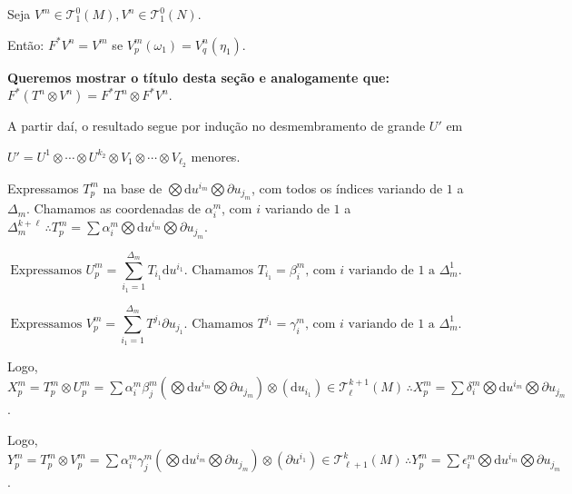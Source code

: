 \documentclass[12pt]{article}
\begin{document}
		\vspace{3mm}

		Seja $V^m \in \mathcal{T}^0_1(M), V^n \in \mathcal{T}^0_1(N)$.

		Ent\~ao: $F^* V^n = V^m$ se $V^m_p (\omega_1) = V_q^n (\eta_1)$.

		\vspace{3mm}

		\textbf{Queremos mostrar o t\'itulo desta se\c{c}\~ao e analogamente que: } $F^* (T^n \otimes V^n) = F^* T^n \otimes F^* V^n$.

		A partir da\'i, o resultado segue por indu\c{c}\~ao no desmembramento de grande $U'$ em

		$U' = U^1 \otimes \cdots \otimes U^{k_2} \otimes V_1 \otimes \cdots \otimes V_{\ell_2}$ menores.

		\vspace{3mm}

		Expressamos $T_p^m$ na base de $\bigotimes \mathrm{d}u^{i_m} \bigotimes \partial u_{j_m}$, com todos os \'indices variando de $1$ a $\Delta_m$. Chamamos as coordenadas de $\alpha_i^m$, com $i$ variando de $1$ a $\Delta_m^{k + \ell}\,\therefore T_p^m = \sum \alpha_i^m \bigotimes \mathrm{d}u^{i_m} \bigotimes \partial u_{j_m}$.

\begin{equation*}
		\text{Expressamos }U_p^m = \sum_{i_1 = 1}^{\Delta_m} T_{i_1} \mathrm{d}u^{i_1}\text{. Chamamos }T_{i_1} = \beta_i^m\text{, com }i\text{ variando de }1\text{ a }\Delta_m^1.
\end{equation*}

\begin{equation*}
		\text{Expressamos }V_p^m = \sum_{i_1 = 1}^{\Delta_m} T^{j_1} \partial u_{j_1}\text{. Chamamos }T^{j_1} = \gamma_i^m\text{, com }i\text{ variando de }1\text{ a }\Delta_m^1.
\end{equation*}

		Logo, $X_p^m = T_p^m \otimes U_p^m = \sum \alpha_i^m \beta_j^m (\bigotimes \mathrm{d}u^{i_m} \bigotimes \partial u_{j_m}) \otimes (\mathrm{d}u_{i_1}) \in \mathcal{T}^{k+1}_\ell(M)\,\therefore X_p^m = \sum \delta_i^m \bigotimes \mathrm{d}u^{i_m} \bigotimes \partial u_{j_m}$.

		\vspace{3mm}

		Logo, $Y_p^m = T_p^m \otimes V_p^m = \sum \alpha_i^m \gamma_j^m (\bigotimes \mathrm{d}u^{i_m} \bigotimes \partial u_{j_m}) \otimes (\partial u^{i_1}) \in \mathcal{T}^k_{\ell+1}(M)\,\therefore Y_p^m = \sum \epsilon_i^m \bigotimes \mathrm{d}u^{i_m} \bigotimes \partial u_{j_m}$.
\end{document}
